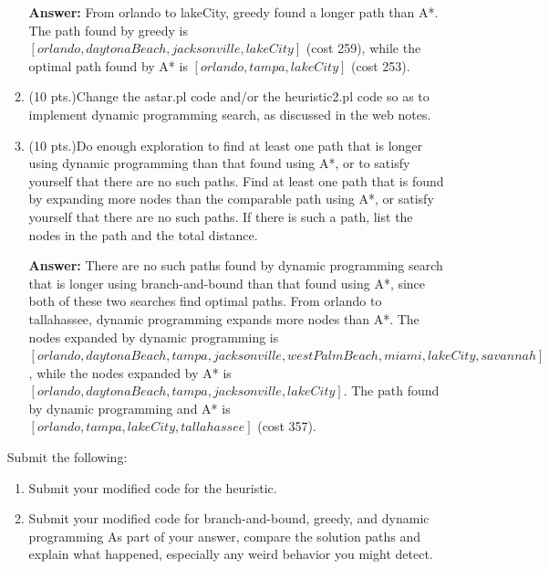 \documentclass{article}%
\begin{document}
\begin{enumerate}
\begin{enumerate}
  		\textbf{Answer:} From orlando to lakeCity, greedy found a longer path than A*. The path found by greedy is $\left[orlando, daytonaBeach, jacksonville, lakeCity \right]$ (cost 259), while the optimal path found by A* is $\left[orlando, tampa, lakeCity \right]$ (cost 253).
  		
  		\item (10 pts.)Change the astar.pl code and/or the heuristic2.pl code so as to implement dynamic programming search, as discussed in the web notes.
  		\item (10 pts.)Do enough exploration to find at least one path that is longer using dynamic programming than that found using A*, or to satisfy yourself that there are no such paths. Find at least one path that is found by expanding more nodes than the comparable path using A*, or satisfy yourself that there are no such paths. If there is such a path, list the nodes in the path and the total distance.
  		
  		
  		\textbf{Answer:} There are no such paths found by dynamic programming search that is longer using branch-and-bound than that found using A*, since both of these two searches find optimal paths. From orlando to tallahassee, dynamic programming expands more nodes than A*. The nodes expanded by dynamic programming is \\ $\left[orlando, daytonaBeach, tampa, jacksonville, westPalmBeach,miami,lakeCity,savannah \right]$, while the nodes expanded by A* is $\left[orlando, daytonaBeach, tampa, jacksonville,lakeCity \right]$. The path found by dynamic programming and A* is $\left[orlando, tampa, lakeCity, tallahassee \right]$ (cost 357).
  		 
	\end{enumerate}
	
Submit the following:
	\begin{enumerate}
  		\item Submit your modified code for the heuristic. 
		\item Submit your modified code for branch-and-bound, greedy, and dynamic programming As part of your answer, compare the solution paths and explain what happened, especially any weird behavior you might detect. 
	\end{enumerate}
	

\end{enumerate}
\end{document}
